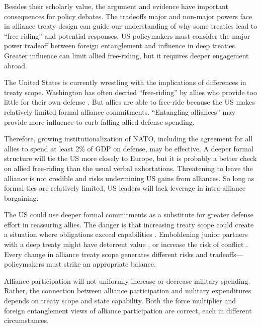 \documentclass[12pt]{article}
\begin{document}
Besides their scholarly value, the argument and evidence have important consequences for policy debates. 
The tradeoffs major and non-major powers face in alliance treaty design can guide our understanding of why some treaties lead to ``free-riding'' and potential responses. 
US policymakers must consider the major power tradeoff between foreign entanglement and influence in deep treaties. 
Greater influence can limit allied free-riding, but it requires deeper engagement abroad. 


The United States is currently wrestling with the implications of differences in treaty scope. 
Washington has often decried ``free-riding'' by allies who provide too little for their own defense \citep{Lanoszka2015}. 
But allies are able to free-ride because the US makes relatively limited formal alliance commitments. 
``Entangling alliances'' may provide more influence to curb falling allied defense spending. 

 
Therefore, growing institutionalization of NATO, including the agreement for all allies to spend at least 2\% of GDP on defense, may be effective.
A deeper formal structure will tie the US more closely to Europe, but it is probably a better check on allied free-riding than the usual verbal exhortations. 
Threatening to leave the alliance is not credible and risks undermining US gains from alliances. 
So long as formal ties are relatively limited, US leaders will lack leverage in intra-alliance bargaining. 


The US could use deeper formal commitments as a substitute for greater defense effort in reassuring allies.
The danger is that increasing treaty scope could create a situation where obligations exceed capabilities \citep{Kennedy1987}. 
Emboldening junior partners with a deep treaty might have deterrent value \citep{Bensonetal2014}, or increase the risk of conflict \citep{Benson2012}.
Every change in alliance treaty scope generates different risks and tradeoffs--- policymakers must strike an appropriate balance. 
 

Alliance participation will not uniformly increase or decrease military spending. 
Rather, the connection between alliance participation and military expenditures depends on treaty scope and state capability.  
Both the force multiplier and foreign entanglement views of alliance participation are correct, each in different circumstances. 




\singlespace
 
 
\end{document}
